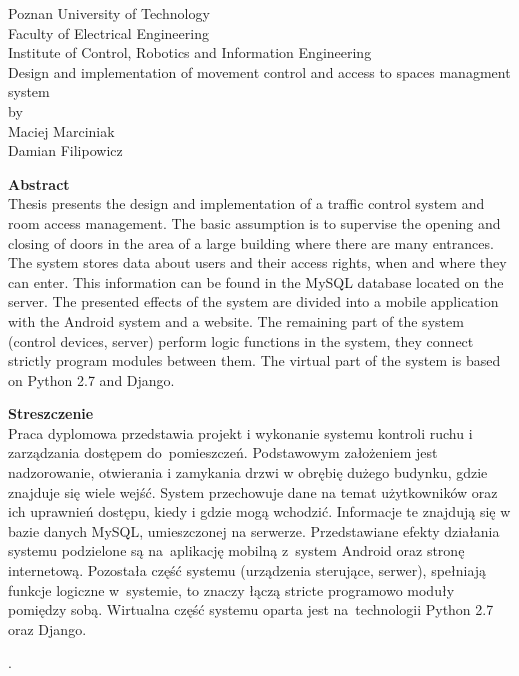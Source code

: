 \documentclass[twoside,10pt]{article}
\def\TytulAngielski {Design and implementation of movement control and access to spaces managment system }
\def\StudentA     {Maciej Marciniak}
\def\StudentB     {Damian Filipowicz}
\begin{document}
\newpage
\setcounter{page}{3}
\thispagestyle{empty}
\begin{center}
Poznan University of Technology\\
Faculty of Electrical Engineering\\
Institute of Control, Robotics and Information Engineering\\
\vspace{20mm}
\huge{\TytulAngielski} \\
\Large{by}\\
\vspace{5mm}
\Large{\StudentA}\\
\Large{\StudentB}\\
\vspace{20mm}

\normalsize\textbf{Abstract} \\
{Thesis presents the design and implementation of a traffic control system and room access management. \linebreak The basic assumption is to supervise the opening and closing of doors in the area of a large building where there are many entrances. The system stores data about users and their access rights, when and where they can enter. This information can be found in the MySQL database located on the server. The presented effects of the system are divided into a mobile application with the Android system and a website. The remaining part of the system (control devices, server) perform logic functions in the system, they connect strictly program modules between them. The virtual part of the system is based on Python 2.7 and Django.} 

\end{center}

\begin{center}
\textbf{Streszczenie} \\
{Praca dyplomowa przedstawia projekt i wykonanie systemu kontroli ruchu i zarządzania dostępem do~pomieszczeń. Podstawowym założeniem jest nadzorowanie, otwierania i zamykania drzwi w obrębię dużego budynku, gdzie znajduje się wiele wejść. System przechowuje dane na temat użytkowników oraz ich uprawnień dostępu, kiedy i gdzie mogą wchodzić. Informacje te znajdują się w bazie danych MySQL, umieszczonej na serwerze. Przedstawiane efekty działania systemu podzielone są na~aplikację mobilną z~system Android oraz stronę internetową. Pozostała część systemu (urządzenia sterujące, serwer), spełniają funkcje logiczne w~systemie, to znaczy łączą stricte programowo moduły pomiędzy sobą. Wirtualna część systemu oparta jest na~technologii Python 2.7 oraz Django.} 
\end{center}
\newpage
\thispagestyle{empty}
{\tiny .}
\end{document}
